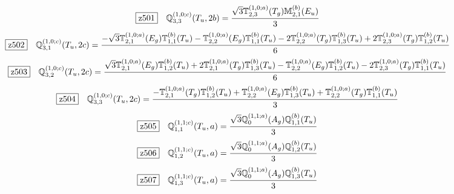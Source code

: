 \documentclass[fleqn,10pt,landscape]{jsarticle}
\begin{document}
\begin{dmath*}
\hspace*{3mm}\fbox{z501}\quad \mathbb{Q}_{3,3}^{(1,0;c)}(T_{u},2b)=\frac{\sqrt{3} \mathbb{T}_{2,3}^{(1,0;a)}(T_{g}) \mathbb{M}_{2,1}^{(b)}(E_{u})}{3}
\end{dmath*}
\begin{dmath*}
\hspace*{3mm}\fbox{z502}\quad \mathbb{Q}_{3,1}^{(1,0;c)}(T_{u},2c)=\frac{- \sqrt{3} \mathbb{T}_{2,1}^{(1,0;a)}(E_{g}) \mathbb{T}_{1,1}^{(b)}(T_{u}) - \mathbb{T}_{2,2}^{(1,0;a)}(E_{g}) \mathbb{T}_{1,1}^{(b)}(T_{u}) - 2 \mathbb{T}_{2,2}^{(1,0;a)}(T_{g}) \mathbb{T}_{1,3}^{(b)}(T_{u}) + 2 \mathbb{T}_{2,3}^{(1,0;a)}(T_{g}) \mathbb{T}_{1,2}^{(b)}(T_{u})}{6}
\end{dmath*}
\begin{dmath*}
\hspace*{3mm}\fbox{z503}\quad \mathbb{Q}_{3,2}^{(1,0;c)}(T_{u},2c)=\frac{\sqrt{3} \mathbb{T}_{2,1}^{(1,0;a)}(E_{g}) \mathbb{T}_{1,2}^{(b)}(T_{u}) + 2 \mathbb{T}_{2,1}^{(1,0;a)}(T_{g}) \mathbb{T}_{1,3}^{(b)}(T_{u}) - \mathbb{T}_{2,2}^{(1,0;a)}(E_{g}) \mathbb{T}_{1,2}^{(b)}(T_{u}) - 2 \mathbb{T}_{2,3}^{(1,0;a)}(T_{g}) \mathbb{T}_{1,1}^{(b)}(T_{u})}{6}
\end{dmath*}
\begin{dmath*}
\hspace*{3mm}\fbox{z504}\quad \mathbb{Q}_{3,3}^{(1,0;c)}(T_{u},2c)=\frac{- \mathbb{T}_{2,1}^{(1,0;a)}(T_{g}) \mathbb{T}_{1,2}^{(b)}(T_{u}) + \mathbb{T}_{2,2}^{(1,0;a)}(E_{g}) \mathbb{T}_{1,3}^{(b)}(T_{u}) + \mathbb{T}_{2,2}^{(1,0;a)}(T_{g}) \mathbb{T}_{1,1}^{(b)}(T_{u})}{3}
\end{dmath*}
\begin{dmath*}
\hspace*{3mm}\fbox{z505}\quad \mathbb{Q}_{1,1}^{(1,1;c)}(T_{u},a)=\frac{\sqrt{3} \mathbb{Q}_{0}^{(1,1;a)}(A_{g}) \mathbb{Q}_{1,1}^{(b)}(T_{u})}{3}
\end{dmath*}
\begin{dmath*}
\hspace*{3mm}\fbox{z506}\quad \mathbb{Q}_{1,2}^{(1,1;c)}(T_{u},a)=\frac{\sqrt{3} \mathbb{Q}_{0}^{(1,1;a)}(A_{g}) \mathbb{Q}_{1,2}^{(b)}(T_{u})}{3}
\end{dmath*}
\begin{dmath*}
\hspace*{3mm}\fbox{z507}\quad \mathbb{Q}_{1,3}^{(1,1;c)}(T_{u},a)=\frac{\sqrt{3} \mathbb{Q}_{0}^{(1,1;a)}(A_{g}) \mathbb{Q}_{1,3}^{(b)}(T_{u})}{3}
\end{dmath*}
\end{document}
